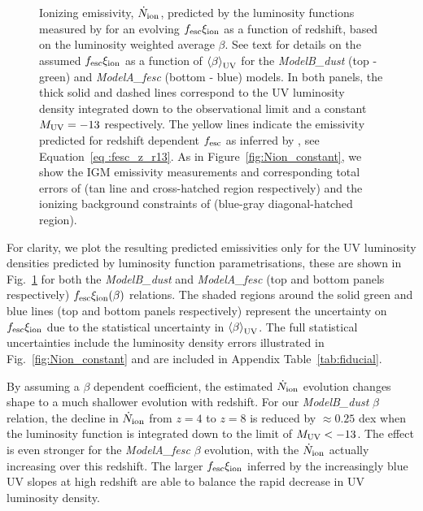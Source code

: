 \begin{figure}
  \caption[Ionizing emissivity, $\dot{N}_{\rm{ion}}$, predicted by the luminosity functions measured by \citet{Bouwens:2014tx} for an evolving $f_{\rm{esc}}\xi_{\rm{ion}}$ as a function of redshift, based on the luminosity weighted average $\beta$.]{Ionizing emissivity, $\dot{N}_{\rm{ion}}$, predicted by the luminosity functions measured by \citet{Bouwens:2014tx} for an evolving $f_{\rm{esc}}\xi_{\rm{ion}}$ as a function of redshift, based on the luminosity weighted average $\beta$. See text for details on the assumed $f_{\rm{esc}}\xi_{\rm{ion}}$ as a function of $\left \langle \beta  \right \rangle_{\rm{UV}}$ for the \emph{ModelB\_dust} (top - green) and \emph{ModelA\_fesc} (bottom - blue) models. In both panels, the thick solid and dashed lines correspond to the UV luminosity density integrated down to the observational limit and a constant $M_{\rm{UV}} = -13$ respectively. The yellow lines indicate the emissivity predicted for redshift dependent $f_{\rm{esc}}$ as inferred by \citet{Robertson:2013ji}, see Equation~\ref{eq	:fesc_z_r13}. As in Figure~\ref{fig:Nion_constant}, we show the IGM emissivity measurements and corresponding total errors of \citet{Becker:2013hc} (tan line and cross-hatched region respectively) and the ionizing background constraints of \citet{Bouwens:2015tm} (blue-gray diagonal-hatched region).}
  \label{fig:Nion_xi_kappa_z}
\end{figure}

For clarity, we plot the resulting predicted emissivities only for the UV luminosity densities predicted by \citet{Bouwens:2014tx} luminosity function parametrisations, these are shown in Fig.~\ref{fig:Nion_xi_kappa_z} for both the \emph{ModelB\_dust} and \emph{ModelA\_fesc} (top and bottom panels respectively) $f_{\rm{esc}}\xi_{\rm{ion}}(\beta)$ relations. The shaded regions around the solid green and blue lines (top and bottom panels respectively) represent the uncertainty on $f_{\rm{esc}}\xi_{\rm{ion}}$ due to the statistical uncertainty in $\left \langle \beta  \right \rangle_{\rm{UV}}$. The full statistical uncertainties include the luminosity density errors illustrated in Fig.~\ref{fig:Nion_constant} and are included in Appendix Table~\ref{tab:fiducial}.

By assuming a $\beta$ dependent coefficient, the estimated $\dot{N}_{\rm{ion}}$ evolution changes shape to a much shallower evolution with redshift. For our \emph{ModelB\_dust} $\beta$ relation, the decline in $\dot{N}_{\rm{ion}}$ from $z=4$ to $z=8$ is reduced by $\approx 0.25$ dex when the luminosity function is integrated down to the limit of $M_{\rm{UV}} < -13$. The effect is even stronger for the \emph{ModelA\_fesc} $\beta$ evolution, with the $\dot{N}_{\rm{ion}}$ actually increasing over this redshift. The larger $f_{\rm{esc}}\xi_{\rm{ion}}$ inferred by the increasingly blue UV slopes at high redshift are able to balance the rapid decrease in UV luminosity density.

